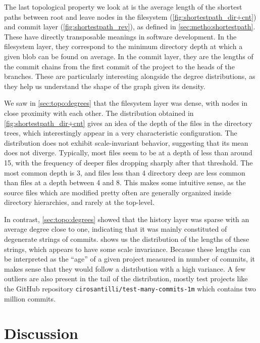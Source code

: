 The last topological property we look at is the average length of the shortest
paths between root and leave nodes in the filesystem
(\cref{fig:shortestpath_dir+cnt}) and commit layer
(\cref{fig:shortestpath_rev}), as defined in \cref{sec:metho:shortestpath}.
These have directly transposable meanings in software development. In the
filesystem layer, they correspond to the minimum directory depth at which a
given blob can be found on average. In the commit layer, they are the lengths
of the commit chains from the first commit of the project to the heads of the
branches.  These are particularly interesting alongside the degree
distributions, as they help us understand the shape of the graph given its
density.

We saw in \cref{sec:topo:degrees} that the filesystem layer was dense,
with nodes in close proximity with each other.  The distribution obtained in
\cref{fig:shortestpath_dir+cnt} gives an idea of the depth of the files in the
directory trees, which interestingly appear in a very characteristic
configuration. The distribution does not exhibit scale-invariant behavior,
suggesting that its mean does not diverge.  Typically, most files seem to be at
a depth of less than around 15, with the frequency of deeper files dropping
sharply after that threshold.  The most common depth is 3, and files less than
4 directory deep are less common than files at a depth between 4 and 8. This
makes some intuitive sense, as the source files which are modified pretty often
are generally organized inside directory hierarchies, and rarely at the
top-level.

In contrast, \cref{sec:topo:degrees} showed that the history layer was
sparse with an average degree close to one, indicating that it was mainly
constituted of degenerate strings of commits.  shows
us the distribution of the lengths of these strings, which appears to have some
scale invariance. Because these lengths can be interpreted as the ``age'' of a
given project measured in number of commits, it makes sense that they would
follow a distribution with a high variance.
A few outliers are also present in the tail of the distribution, mostly test
projects like the GitHub repository \texttt{cirosantilli/test-many-commits-1m}
which contains two million commits.

\section{Discussion}%
\label{sec:topology-discussion}

